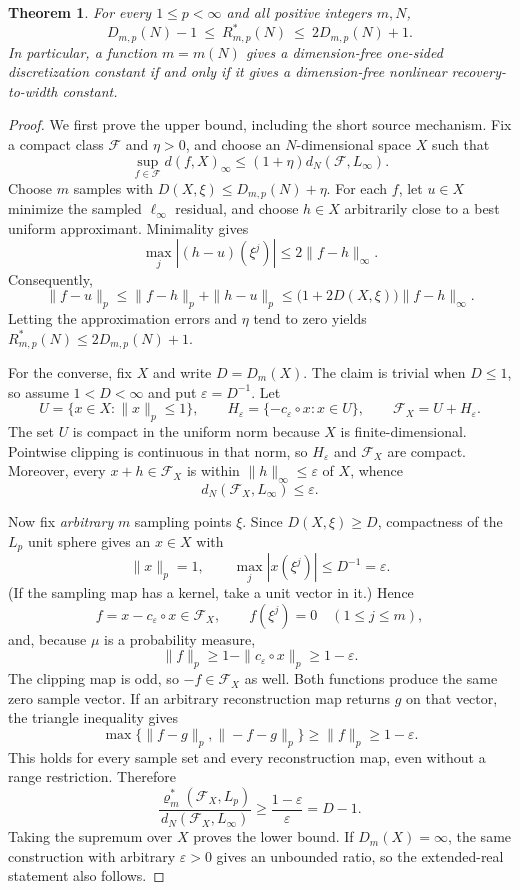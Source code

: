 \documentclass[11pt]{article}
\newtheorem{theorem}{Theorem}
\newcommand{\F}{\mathcal F}
\newcommand{\rhoo}{\varrho^{*}}
\begin{document}
\begin{theorem}\label{thm:main}
For every $1\le p<\infty$ and all positive integers $m,N$,
\[
 \boxed{\quad D_{m,p}(N)-1\ \le\ R^*_{m,p}(N)\
 \le\ 2D_{m,p}(N)+1.\quad}
\]
In particular, a function $m=m(N)$ gives a dimension-free one-sided
discretization constant if and only if it gives a dimension-free nonlinear
recovery-to-width constant.
\end{theorem}

\begin{proof}
We first prove the upper bound, including the short source mechanism.  Fix a
compact class $\F$ and $\eta>0$, and choose an $N$-dimensional space $X$ such
that
\[
 \sup_{f\in\F}d(f,X)_\infty
 \le (1+\eta)d_N(\F,L_\infty).
\]
Choose $m$ samples with $D(X,\xi)\le D_{m,p}(N)+\eta$.  For each $f$, let
$u\in X$ minimize the sampled $\ell_\infty$ residual, and choose $h\in X$
arbitrarily close to a best uniform approximant.  Minimality gives
\[
 \max_j|(h-u)(\xi^j)|
 \le 2\|f-h\|_\infty.
\]
Consequently,
\[
 \|f-u\|_p
 \le \|f-h\|_p+\|h-u\|_p
 \le \bigl(1+2D(X,\xi)\bigr)\|f-h\|_\infty.
\]
Letting the approximation errors and $\eta$ tend to zero yields
$R^*_{m,p}(N)\le2D_{m,p}(N)+1$.

For the converse, fix $X$ and write $D=D_m(X)$.  The claim is trivial when
$D\le1$, so assume $1<D<\infty$ and put $\varepsilon=D^{-1}$.  Let
\[
 U=\{x\in X:\|x\|_p\le1\},\qquad
 H_\varepsilon=\{-c_\varepsilon\circ x:x\in U\},\qquad
 \F_X=U+H_\varepsilon.
\]
The set $U$ is compact in the uniform norm because $X$ is finite-dimensional.
Pointwise clipping is continuous in that norm, so $H_\varepsilon$ and
$\F_X$ are compact.  Moreover, every $x+h\in\F_X$ is within
$\|h\|_\infty\le\varepsilon$ of $X$, whence
\[
 d_N(\F_X,L_\infty)\le\varepsilon.
\]

Now fix \emph{arbitrary} $m$ sampling points $\xi$.  Since
$D(X,\xi)\ge D$, compactness of the $L_p$ unit sphere gives an $x\in X$ with
\[
 \|x\|_p=1,
 \qquad \max_j|x(\xi^j)|\le D^{-1}=\varepsilon.
\]
(If the sampling map has a kernel, take a unit vector in it.)  Hence
\[
 f=x-c_\varepsilon\circ x\in\F_X,
 \qquad f(\xi^j)=0\quad(1\le j\le m),
\]
and, because $\mu$ is a probability measure,
\[
 \|f\|_p\ge1-\|c_\varepsilon\circ x\|_p\ge1-\varepsilon.
\]
The clipping map is odd, so $-f\in\F_X$ as well.  Both functions produce the
same zero sample vector.  If an arbitrary reconstruction map returns $g$ on
that vector, the triangle inequality gives
\[
 \max\{\|f-g\|_p,\|-f-g\|_p\}\ge\|f\|_p\ge1-\varepsilon.
\]
This holds for every sample set and every reconstruction map, even without a
range restriction.  Therefore
\[
 \frac{\rhoo_m(\F_X,L_p)}{d_N(\F_X,L_\infty)}
 \ge \frac{1-\varepsilon}{\varepsilon}=D-1.
\]
Taking the supremum over $X$ proves the lower bound.  If $D_m(X)=\infty$,
the same construction with arbitrary $\varepsilon>0$ gives an unbounded
ratio, so the extended-real statement also follows.
\end{proof}
\end{document}
